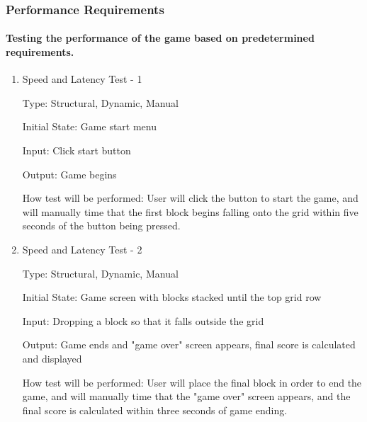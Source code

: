 \documentclass[12pt, titlepage]{article}
\begin{document}
\subsubsection{Performance Requirements}
\paragraph{Testing the performance of the game based on predetermined requirements.}

\begin{enumerate}

\item{Speed and Latency Test - 1\\}

Type: Structural, Dynamic, Manual
					
Initial State: Game start menu
					
Input: Click start button 
					
Output: Game begins
					
How test will be performed: User will click the button to start the game, and will manually time that the first block begins falling onto the grid within five seconds of the button being pressed. 

\item{Speed and Latency Test - 2\\}

Type: Structural, Dynamic, Manual
					
Initial State: Game screen with blocks stacked until the top grid row
					
Input: Dropping a block so that it falls outside the grid
					
Output: Game ends and "game over" screen appears, final score is calculated and displayed
					
How test will be performed: User will place the final block in order to end the game, and will manually time that the "game over" screen appears, and the final score is calculated within three seconds of game ending. 

\end{enumerate}
\end{document}
